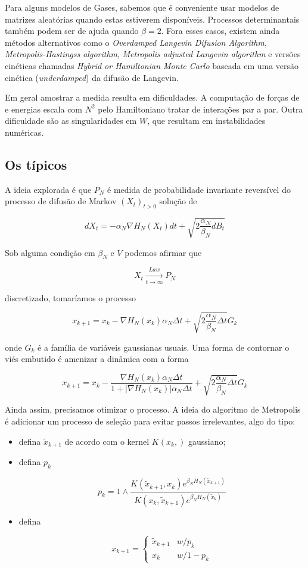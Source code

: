 Para alguns modelos de Gases, sabemos que é conveniente usar modelos de matrizes aleatórias quando estas estiverem disponíveis. Processos determinantais também podem ser de ajuda quando $\beta = 2$. Fora esses casos, existem ainda métodos alternativos como o \textit{Overdamped Langevin Difusion Algorithm}, \textit{Metropolis-Hastingss algorithm}, \textit{Metropolis adjusted Langevin algorithm} e versões cinéticas chamadas \textit{Hybrid or Hamiltonian Monte Carlo} baseada em uma versão cinética (\textit{underdamped}) da difusão de Langevin.

Em geral amostrar a medida resulta em dificuldades. A computação de forças de e energias escala com $N^2$ pelo Hamiltoniano tratar de interações par a par. Outra dificuldade são as singularidades em $W$, que resultam em instabilidades numéricas.

\subsection{Os típicos}

A ideia explorada é que $P_N$ é medida de probabilidade invariante reversível do processo de difusão de Markov $(X_t)_{t>0}$ solução de

\[
	dX_t = -\alpha_N \nabla H_N(X_t) dt + \sqrt{2\frac{\alpha_N}{\beta_N} dB_t}
\]

Sob alguma condição em $\beta_N$ e $V$ podemos afirmar que

\[
	X_t \xrightarrow[t \rightarrow \infty]{Law} P_N
\]

discretizado, tomaríamos o processo

\[
	x_{k+1} = x_k - \nabla H_N(x_k) \alpha_N \Delta t + \sqrt{2\frac{\alpha_N}{\beta_N} \Delta t} G_k
\]

onde $G_k$ é a família de variáveis gaussianas usuais. Uma forma de contornar o viés embutido é amenizar a dinâmica com a forma

\[
x_{k+1} = x_k - \frac{\nabla H_N(x_k) \alpha_N \Delta t}{1 + |\nabla H_N(x_k)| \alpha_N \Delta t} + \sqrt{2\frac{\alpha_N}{\beta_N} \Delta t} G_k
\]


Ainda assim, precisamos otimizar o processo. A ideia do algoritmo de Metropolis é adicionar um processo de seleção para evitar passos irrelevantes, algo do tipo:

\begin{itemize}
	\item defina $\tilde{x}_{k+1}$ de acordo com o kernel $K(x_k,)$ gaussiano;
	
	\item defina $p_k$
	
	\[
		p_k = 1 \wedge \frac{K(\tilde{x}_{k+1},x_k) e^{\beta_N H_N(\tilde{x}_{k+1})}}{K(x_{k},\tilde{x}_{k+1}) e^{\beta_N H_N(\tilde{x}_{k})}}
	\]
	
	\item defina
	
	\[
	x_{k+1} = 
	\begin{cases}
		\tilde{x}_{k+1} & w/ p_k \\
		x_k & w/ 1-p_k
	\end{cases}
	\]
	
\end{itemize}

